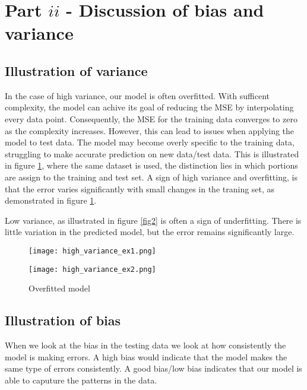 \documentclass{article}
\begin{document}
\section*{Part \(ii\) - Discussion of bias and variance}
\subsection*{Illustration of variance}

In the case of high variance, our model is often overfitted. With sufficent complexity, the model
can achive its goal of reducing the MSE by interpolating every data point. Consequently, the MSE for the training data 
converges to zero as the complexity increases. However, this can lead to issues when applying the model to test data.
The model may become overly specific to the training data, struggling to make accurate prediction on new data/test data.
This is illustrated in figure \ref{fig1}, where the same dataset is used, the distinction lies in which
portions are assign to the training and test set. A sign of high variance and overfitting, is that
the error varies significantly with small changes in the traning set, as demonstrated in figure \ref{fig1}. 

Low variance, as illustrated in figure \ref{fig2} is often a sign of underfitting. There is little variation
in the predicted model, but the error remains significantly large.

\begin{figure}[ht]
    \centering
    \begin{minipage}{0.5\textwidth}
        \centering
        \texttt{[image: high\_variance\_ex1.png]}
    \end{minipage}\hfill
    \begin{minipage}{0.5\textwidth}
        \centering
        \texttt{[image: high\_variance\_ex2.png]}
    \end{minipage}\hfill
    \caption{Overfitted model}
    \label{fig1}
\end{figure}

\subsection*{Illustration of bias}
When we look at the bias in the testing data we look at how consistently the model is making errors. 
A high bias would indicate that the model makes the same type of errors consistently. A good bias/low bias
indicates that our model is able to caputure the patterns in the data.
\end{document}
